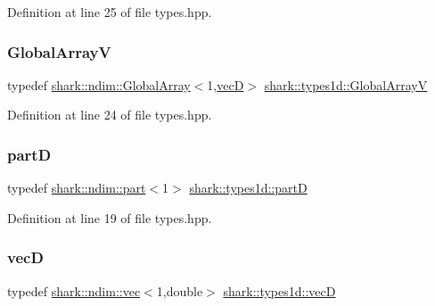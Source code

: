 Definition at line 25 of file types.\+hpp.

\hypertarget{namespaceshark_1_1types1d_af18105ae16d2dd8b62620f8ee6328bc1}{}\label{namespaceshark_1_1types1d_af18105ae16d2dd8b62620f8ee6328bc1} 
\subsubsection{\texorpdfstring{Global\+ArrayV}{GlobalArrayV}}
{\footnotesize\ttfamily typedef \hyperlink{classshark_1_1ndim_1_1_global_array}{shark\+::ndim\+::\+Global\+Array}$<$1,\hyperlink{namespaceshark_1_1types1d_a96b222de82755e7cdf915ca4652abb00}{vecD}$>$ \hyperlink{namespaceshark_1_1types1d_af18105ae16d2dd8b62620f8ee6328bc1}{shark\+::types1d\+::\+Global\+ArrayV}}



Definition at line 24 of file types.\+hpp.

\hypertarget{namespaceshark_1_1types1d_a46775e0f758bf283c37ef3733ac9e294}{}\label{namespaceshark_1_1types1d_a46775e0f758bf283c37ef3733ac9e294} 
\subsubsection{\texorpdfstring{partD}{partD}}
{\footnotesize\ttfamily typedef \hyperlink{structshark_1_1ndim_1_1part}{shark\+::ndim\+::part}$<$1$>$ \hyperlink{namespaceshark_1_1types1d_a46775e0f758bf283c37ef3733ac9e294}{shark\+::types1d\+::partD}}



Definition at line 19 of file types.\+hpp.

\hypertarget{namespaceshark_1_1types1d_a96b222de82755e7cdf915ca4652abb00}{}\label{namespaceshark_1_1types1d_a96b222de82755e7cdf915ca4652abb00} 
\subsubsection{\texorpdfstring{vecD}{vecD}}
{\footnotesize\ttfamily typedef \hyperlink{structshark_1_1ndim_1_1vec}{shark\+::ndim\+::vec}$<$1,double$>$ \hyperlink{namespaceshark_1_1types1d_a96b222de82755e7cdf915ca4652abb00}{shark\+::types1d\+::vecD}}



